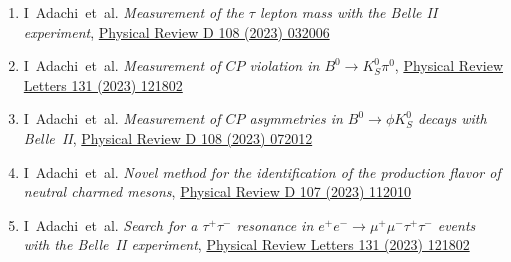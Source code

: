 \documentclass[12pt]{article}
\begin{document}
\begin{enumerate}[a.]
\begin{enumerate}[1.]
  \item I~Adachi~et~al. \emph{Measurement of the $\tau$ lepton mass with the Belle II experiment}, \href{https://doi.org/10.1103/PhysRevD.108.032006}{Physical Review D 108 (2023) 032006}
  \item I~Adachi~et~al. \emph{Measurement of $CP$ violation in $B^0 \rightarrow K^0_{S} \pi^0$}, \href{https://doi.org/10.1103/PhysRevLett.131.111803}{Physical Review Letters 131 (2023) 121802}
  \item I~Adachi~et~al. \emph{Measurement of $CP$ asymmetries in $B^0 \rightarrow \phi K^0_{S}$ decays with Belle~II}, \href{https://doi.org/10.1103/PhysRevD.108.072012}{Physical Review D 108 (2023) 072012}
  \item I~Adachi~et~al. \emph{Novel method for the identification of the production flavor of neutral charmed mesons}, \href{https://doi.org/10.1103/PhysRevD.107.112010}{Physical Review D 107 (2023) 112010}
  \item I~Adachi~et~al. \emph{Search for a $\tau^+\tau^-$ resonance in $e^{+}e^{-}\rightarrow \mu^{+}\mu^{-} \tau^+\tau^-$ events with the Belle~II experiment}, \href{https://doi.org/10.1103/PhysRevLett.131.121802}{Physical Review Letters 131 (2023) 121802}
  \end{enumerate} 
  \end{enumerate} 
\end{document}
